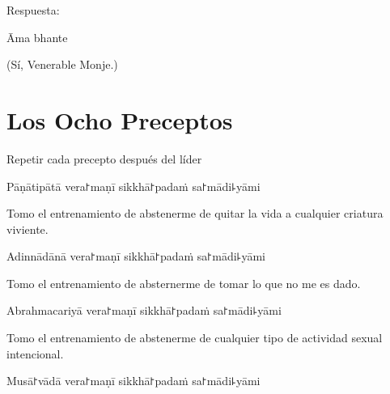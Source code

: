 \begin{instruction}
  Respuesta:
\end{instruction}

Āma bhante

\begin{english}
  (Sí, Venerable Monje.)
\end{english}

\chapter{Los Ocho Preceptos}

\begin{instruction}
  Repetir cada precepto después del líder
\end{instruction}

\begin{precept}
  \setcounter{enumi}{0}
  \item Pāṇātipātā vera꜓maṇī sikkhā꜓padaṁ sa꜓mādi꜕yāmi
\end{precept}

\begin{english}
  Tomo el entrenamiento de abstenerme de quitar la vida a cualquier criatura viviente.
\end{english}

\begin{precept}
  \setcounter{enumi}{1}
  \item Adinnādānā vera꜓maṇī sikkhā꜓padaṁ sa꜓mādi꜕yāmi
\end{precept}

\begin{english}
  Tomo el entrenamiento de absternerme de tomar lo que no me es dado.
\end{english}

\begin{precept}
  \setcounter{enumi}{2}
  \item Abrahmacariyā vera꜓maṇī sikkhā꜓padaṁ sa꜓mādi꜕yāmi
\end{precept}

\begin{english}
  Tomo el entrenamiento de abstenerme de cualquier tipo de actividad sexual intencional.
\end{english}

\begin{precept}
  \setcounter{enumi}{3}
  \item Musā꜓vādā vera꜓maṇī sikkhā꜓padaṁ sa꜓mādi꜕yāmi
\end{precept}

